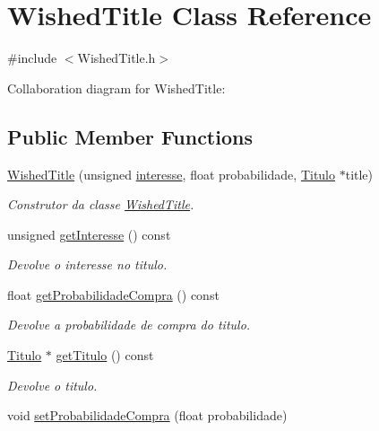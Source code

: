 \hypertarget{class_wished_title}{}\section{Wished\+Title Class Reference}
\label{class_wished_title}


{\ttfamily \#include $<$Wished\+Title.\+h$>$}



Collaboration diagram for Wished\+Title\+:
\subsection*{Public Member Functions}
\begin{DoxyCompactItemize}
\item 
\mbox{\hyperlink{class_wished_title_a27a60af16f94343ee502445e855a5659}{Wished\+Title}} (unsigned \mbox{\hyperlink{class_wished_title_ae2a507c7b927da32f5e86c084ad56bda}{interesse}}, float probabilidade, \mbox{\hyperlink{class_titulo}{Titulo}} $\ast$title)
\begin{DoxyCompactList}\small\item\em Construtor da classe \mbox{\hyperlink{class_wished_title}{Wished\+Title}}. \end{DoxyCompactList}\item 
unsigned \mbox{\hyperlink{class_wished_title_af436ada1ae78a4ffc8031863c0f21859}{get\+Interesse}} () const
\begin{DoxyCompactList}\small\item\em Devolve o interesse no titulo. \end{DoxyCompactList}\item 
float \mbox{\hyperlink{class_wished_title_a9076a3f48cb0bbd435908c392e5041a9}{get\+Probabilidade\+Compra}} () const
\begin{DoxyCompactList}\small\item\em Devolve a probabilidade de compra do titulo. \end{DoxyCompactList}\item 
\mbox{\hyperlink{class_titulo}{Titulo}} $\ast$ \mbox{\hyperlink{class_wished_title_a9ca6e92a26bb2f319a39d5a03b0c42bd}{get\+Titulo}} () const
\begin{DoxyCompactList}\small\item\em Devolve o titulo. \end{DoxyCompactList}\item 
void \mbox{\hyperlink{class_wished_title_aacaf6dfce83390dcc78f0ecd679e1de1}{set\+Probabilidade\+Compra}} (float probabilidade)

\end{DoxyCompactItemize}
